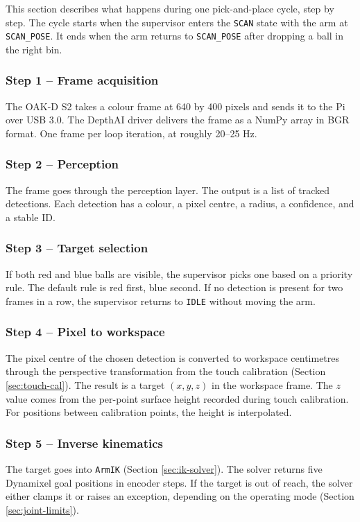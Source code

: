 \label{sec:data-flow}
This section describes what happens during one pick-and-place cycle,
step by step. The cycle starts when the supervisor enters the
\texttt{SCAN} state with the arm at \texttt{SCAN\_POSE}. It ends when
the arm returns to \texttt{SCAN\_POSE} after dropping a ball in the
right bin.
\subsubsection*{Step 1 -- Frame acquisition}
The OAK-D S2 takes a colour frame at 640 by 400 pixels and sends it
to the Pi over USB 3.0. The DepthAI driver delivers the frame as a
NumPy array in BGR format. One frame per loop iteration, at roughly
20--25 Hz.
\subsubsection*{Step 2 -- Perception}
The frame goes through the perception layer. The output is a list of
tracked detections. Each detection has a colour, a pixel centre, a
radius, a confidence, and a stable ID.
\subsubsection*{Step 3 -- Target selection}
If both red and blue balls are visible, the supervisor picks one based
on a priority rule. The default rule is red first, blue second. If no
detection is present for two frames in a row, the supervisor returns
to \texttt{IDLE} without moving the arm.
\subsubsection*{Step 4 -- Pixel to workspace}
The pixel centre of the chosen detection is converted to workspace
centimetres through the perspective transformation from the touch
calibration (Section \ref{sec:touch-cal}). The result is a target
$(x, y, z)$ in the workspace frame. The $z$ value comes from the
per-point surface height recorded during touch calibration. For
positions between calibration points, the height is interpolated.
\subsubsection*{Step 5 -- Inverse kinematics}
The target goes into \texttt{ArmIK} (Section \ref{sec:ik-solver}). The
solver returns five Dynamixel goal positions in encoder steps. If the
target is out of reach, the solver either clamps it or raises an
exception, depending on the operating mode
(Section \ref{sec:joint-limits}).
